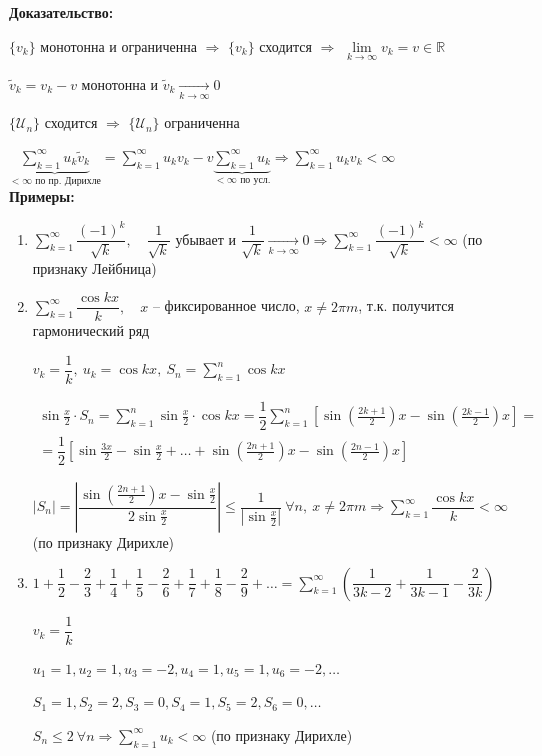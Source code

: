 \documentclass[a4paper,12pt]{article} %
\newcommand{\R}{\mathbb{R}}
\newcommand{\series}{\sum\limits_{k=1}^{\infty}}
\newcommand{\useries}{\sum\limits_{k=1}^{\infty} u_k}
\newcommand{\useriesl}{\sum\limits_{k=1}^{\infty} u_k < \infty}
\begin{document}
\textbf{Доказательство:}

$\{v_k\}$ монотонна и ограниченна $\Rightarrow$ $\{v_k\}$ сходится $\Rightarrow$ $\lim\limits_{k \to \infty} v_k = v \in \R$

$\tilde{v}_k = v_k - v$ монотонна и $\tilde{v}_k \xrightarrow[k \to \infty]{} 0$

$\{\mathscr{U}_n\}$ сходится $\Rightarrow$ $\{\mathscr{U}_n\}$ ограниченна

$\underbrace{\series u_k \tilde{v}_k}_{< \infty \text{ по пр. Дирихле}} = \series u_k v_k - v \underbrace{\useries}_{< \infty \text{ по усл.}} \Rightarrow \series u_k v_k < \infty$\\

\textbf{Примеры:}

\begin{enumerate}
	\item $\series \dfrac{(-1)^k}{\sqrt{k}}, \hspace{1em} \dfrac{1}{\sqrt{k}} \text{ убывает и } \dfrac{1}{\sqrt{k}} \xrightarrow[k \to \infty]{} 0 \Rightarrow \series \dfrac{(-1)^k}{\sqrt{k}} < \infty$ (по признаку Лейбница) 
	\item $\series \dfrac{\cos kx}{k}, \hspace{1em} x$ -- фиксированное число, $x \neq 2 \pi m$, т.к. получится гармонический ряд
	
	$v_k = \dfrac{1}{k}, \ u_k = \cos kx, \ S_n = \sum\limits_{k=1}^{n} \cos kx$
	
	\begin{multline*}
		\sin{\frac{x}{2}} \cdot S_n = \sum\limits_{k=1}^{n} \sin{\frac{x}{2}} \cdot \cos kx = \dfrac{1}{2} \sum\limits_{k=1}^{n} \left[ \sin{\left(\frac{2k+1}{2}\right)x} - \sin{\left(\frac{2k-1}{2}\right)x} \right] = \\ = \dfrac{1}{2} \left[ \sin{\frac{3x}{2}} - \sin{\frac{x}{2}} + \ldots + \sin{\left(\frac{2n+1}{2}\right)x} - \sin{\left(\frac{2n-1}{2}\right)x} \right]
	\end{multline*}

	$\left| S_n \right| = \left| \dfrac{\sin{\left(\frac{2n+1}{2}\right)x} - \sin \frac{x}{2}}{2 \sin\frac{x}{2}} \right| \leqslant \dfrac{1}{\left| \sin \frac{x}{2} \right|} \ \forall n, \ x \neq 2 \pi m \Rightarrow \series \dfrac{\cos kx}{k} < \infty$ (по признаку Дирихле)
	\item $1 + \dfrac{1}{2} - \dfrac{2}{3} + \dfrac{1}{4} + \dfrac{1}{5} - \dfrac{2}{6} + \dfrac{1}{7} + \dfrac{1}{8} - \dfrac{2}{9} + \ldots = \series \left( \dfrac{1}{3k-2} + \dfrac{1}{3k-1} - \dfrac{2}{3k}  \right)$
	
	$v_k = \dfrac{1}{k}$
	
	$u_1 = 1, u_2 = 1, u_3 = -2, u_4 = 1, u_5 = 1, u_6 = -2, \ldots$
	
	$S_1 = 1, S_2 = 2, S_3 = 0, S_4 = 1, S_5 = 2, S_6 = 0, \ldots$
	
	$S_n \leqslant 2 \ \forall n \Rightarrow \useriesl$ (по признаку Дирихле)
\end{enumerate}
\end{document}
